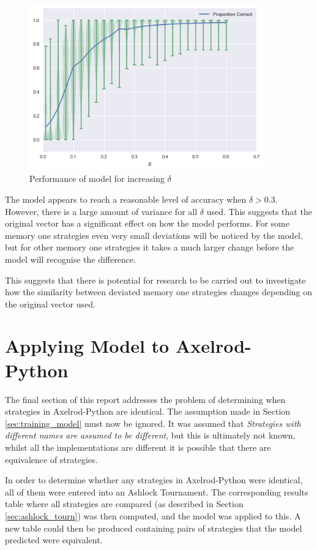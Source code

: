 \begin{figure}[htbp!]
    \centering
    \includegraphics[width=0.9\textwidth]{../img/ML/proportion-correct.png}
    \caption{Performance of model for increasing $\delta$}
    \label{fig:m1_correct}
\end{figure}

The model appears to reach a reasonable level of accuracy when $\delta > 0.3$.
However, there is a large amount of variance for all $\delta$ used.
This suggests that the original vector has a significant effect on how the model performs.
For some memory one strategies even very small deviations will be noticed by the model, but for other memory one strategies it takes a much larger change before the model will recognise the difference.

This suggests that there is potential for research to be carried out to investigate how the similarity between deviated memory one strategies changes depending on the original vector used.



\section{Applying Model to Axelrod-Python}

The final section of this report addresses the problem of determining when strategies in Axelrod-Python are identical.
The assumption made in Section \ref{sec:training_model} must now be ignored.
It was assumed that \textit{Strategies with different names are assumed to be different}, but this is ultimately not known, whilst all the implementations are different it is possible that there are equivalence of strategies.

In order to determine whether any strategies in Axelrod-Python were identical, all of them were entered into an Ashlock Tournament.
The corresponding results table where all strategies are compared (as described in Section \ref{sec:ashlock_tourn}) was then computed, and the model was applied to this.
A new table could then be produced containing pairs of strategies that the model predicted were equivalent.

